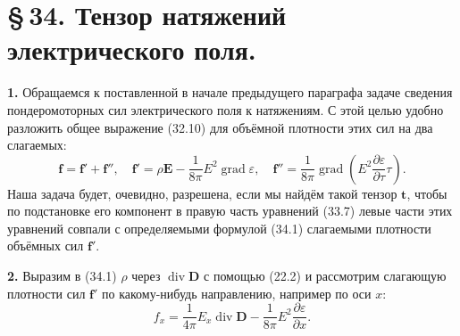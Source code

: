 \documentclass[a4paper,12pt]{article}
\begin{document}
\section*{\S\,34. Тензор натяжений электрического поля.}

\textbf{1.} Обращаемся к поставленной в начале предыдущего параграфа
задаче сведения пондеромоторных сил электрического поля к натяжениям.
С этой целью удобно разложить общее выражение (32.10) для объёмной
плотности этих сил на два слагаемых:
\begin{equation}
    \mathbf{f} = \mathbf{f}' + \mathbf{f}'',
    \quad
    \mathbf{f}' = \rho\mathbf{E} - \frac{1}{8\pi}E^2\operatorname{grad}\varepsilon,
    \quad
    \mathbf{f}'' = \frac{1}{8\pi}\operatorname{grad}\!\left(
        E^2\frac{\partial\varepsilon}{\partial\tau}\tau
    \right).
    \tag{34.1}
\end{equation}
Наша задача будет, очевидно, разрешена, если мы найдём такой тензор
$\mathbf{t}$, чтобы по подстановке его компонент в правую часть
уравнений (33.7) левые части этих уравнений совпали с определяемыми
формулой (34.1) слагаемыми плотности объёмных сил $\mathbf{f}'$.

\textbf{2.} Выразим в (34.1) $\rho$ через $\operatorname{div}\mathbf{D}$
с помощью (22.2) и рассмотрим слагающую плотности сил $\mathbf{f}'$
по какому-нибудь направлению, например по оси $x$:
$$
    f_x = \frac{1}{4\pi}E_x\operatorname{div}\mathbf{D}
        - \frac{1}{8\pi}E^2\frac{\partial\varepsilon}{\partial x}.
$$

\end{document}
